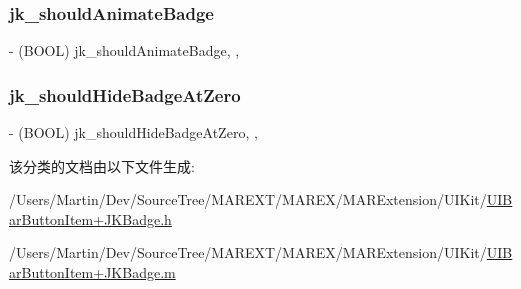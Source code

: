 \subsubsection{\texorpdfstring{jk\+\_\+should\+Animate\+Badge}{jk\_shouldAnimateBadge}}
{\footnotesize\ttfamily -\/ (B\+O\+OL) jk\+\_\+should\+Animate\+Badge\hspace{0.3cm}{\ttfamily [read]}, {\ttfamily [write]}, {\ttfamily [atomic]}}

\mbox{\label{category_u_i_bar_button_item_07_j_k_badge_08_aea988fd50af0f46b7f22e66819ee5c89}} 
\subsubsection{\texorpdfstring{jk\+\_\+should\+Hide\+Badge\+At\+Zero}{jk\_shouldHideBadgeAtZero}}
{\footnotesize\ttfamily -\/ (B\+O\+OL) jk\+\_\+should\+Hide\+Badge\+At\+Zero\hspace{0.3cm}{\ttfamily [read]}, {\ttfamily [write]}, {\ttfamily [atomic]}}



该分类的文档由以下文件生成\+:\begin{DoxyCompactItemize}
\item 
/\+Users/\+Martin/\+Dev/\+Source\+Tree/\+M\+A\+R\+E\+X\+T/\+M\+A\+R\+E\+X/\+M\+A\+R\+Extension/\+U\+I\+Kit/\hyperlink{_u_i_bar_button_item_09_j_k_badge_8h}{U\+I\+Bar\+Button\+Item+\+J\+K\+Badge.\+h}\item 
/\+Users/\+Martin/\+Dev/\+Source\+Tree/\+M\+A\+R\+E\+X\+T/\+M\+A\+R\+E\+X/\+M\+A\+R\+Extension/\+U\+I\+Kit/\hyperlink{_u_i_bar_button_item_09_j_k_badge_8m}{U\+I\+Bar\+Button\+Item+\+J\+K\+Badge.\+m}\end{DoxyCompactItemize}
